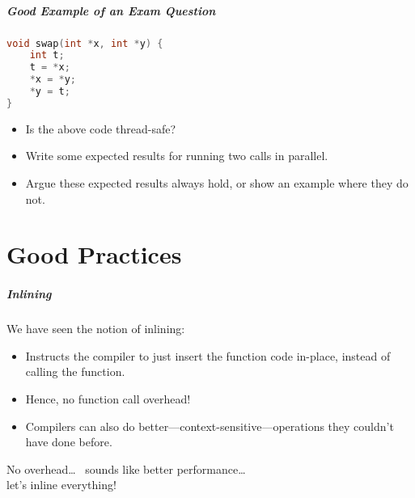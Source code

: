 \begin{frame}[fragile]
  \frametitle{Good Example of an Exam Question}

  

  \begin{lstlisting}[language=C]
void swap(int *x, int *y) {
    int t;
    t = *x;
    *x = *y;
    *y = t;
}  
  \end{lstlisting}
  \vfill
  \begin{itemize}
    \item Is the above code thread-safe?
    \vfill
    \item Write some expected results for running two calls in parallel.
    \vfill
    \item Argue these expected results always hold, or show an example where
      they do not.
  \end{itemize}
  
\end{frame}

\part{Good Practices}
\frame{\partpage}

\begin{frame}
  \frametitle{Inlining}

  

  We have seen the notion of inlining:
  \begin{itemize}
    \item Instructs the compiler to just insert the function code in-place,
      instead of calling the function.
    \item Hence, no function call overhead!
    \item Compilers can also do better---context-sensitive---operations they couldn't
      have done before.
  \end{itemize}
  \vfill
  No overhead\ldots~ sounds like better performance\ldots~ \\let's inline everything!
  
\end{frame}

